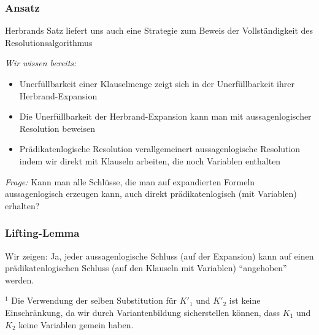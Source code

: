 \documentclass[aspectratio=1610,onlymath]{beamer}
\begin{document}

\begin{frame}\frametitle{Ansatz}

\alert{Herbrands Satz liefert uns auch eine Strategie zum Beweis der Vollständigkeit des Resolutionsalgorithmus}\bigskip

\emph{Wir wissen bereits:}
\begin{itemize}
\item Unerfüllbarkeit einer Klauselmenge zeigt sich in der Unerfüllbarkeit ihrer Herbrand-Expansion
\item Die Unerfüllbarkeit der Herbrand-Expansion kann man mit aussagenlogischer Resolution beweisen
\item Prädikatenlogische Resolution verallgemeinert aussagenlogische Resolution indem wir direkt mit Klauseln arbeiten, die noch Variablen enthalten
\end{itemize}\pause

\emph{Frage:} Kann man alle Schlüsse, die man auf expandierten Formeln aussagenlogisch erzeugen kann, auch direkt prädikatenlogisch (mit Variablen) erhalten?

\end{frame}

\begin{frame}\frametitle{Lifting-Lemma}

Wir zeigen: Ja, jeder aussagenlogische Schluss (auf der Expansion) kann auf einen prädikatenlogischen Schluss (auf den Klauseln mit Variablen) "`angehoben"' werden.\medskip


\color{devilscss}
{\footnotesize ${^1}$ Die Verwendung der selben Substitution für $K'_1$ und $K'_2$ ist keine Einschränkung, da wir durch Variantenbildung sicherstellen können, dass $K_1$ und $K_2$ keine Variablen gemein haben.

}

\end{frame}
\end{document}
